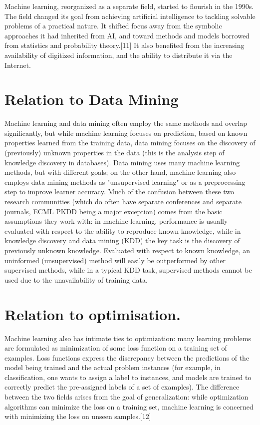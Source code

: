 \documentclass[utf8,bachelor,english]{gradu3}
\begin{document}
Machine learning, reorganized as a separate field, started to flourish in the 1990s. The field changed its goal from achieving artificial intelligence to tackling solvable problems of a practical nature. It shifted focus away from the symbolic approaches it had inherited from AI, and toward methods and models borrowed from statistics and probability theory.[11] It also benefited from the increasing availability of digitized information, and the ability to distribute it via the Internet.

\section{Relation to  Data Mining}

Machine learning and data mining often employ the same methods and overlap significantly, but while machine learning focuses on prediction, based on known properties learned from the training data, data mining focuses on the discovery of (previously) unknown properties in the data (this is the analysis step of knowledge discovery in databases). Data mining uses many machine learning methods, but with different goals; on the other hand, machine learning also employs data mining methods as "unsupervised learning" or as a preprocessing step to improve learner accuracy. Much of the confusion between these two research communities (which do often have separate conferences and separate journals, ECML PKDD being a major exception) comes from the basic assumptions they work with: in machine learning, performance is usually evaluated with respect to the ability to reproduce known knowledge, while in knowledge discovery and data mining (KDD) the key task is the discovery of previously unknown knowledge. Evaluated with respect to known knowledge, an uninformed (unsupervised) method will easily be outperformed by other supervised methods, while in a typical KDD task, supervised methods cannot be used due to the unavailability of training data.

\section{Relation to optimisation.}
Machine learning also has intimate ties to optimization: many learning problems are formulated as minimization of some loss function on a training set of examples. Loss functions express the discrepancy between the predictions of the model being trained and the actual problem instances (for example, in classification, one wants to assign a label to instances, and models are trained to correctly predict the pre-assigned labels of a set of examples). The difference between the two fields arises from the goal of generalization: while optimization algorithms can minimize the loss on a training set, machine learning is concerned with minimizing the loss on unseen samples.[12]
\end{document}
